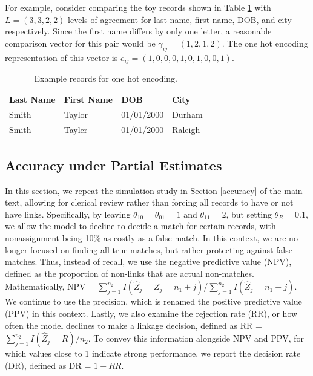 \documentclass[ba]{imsart}
\begin{document}
	For example, consider comparing the toy records shown in Table \ref{tab:ohe} with $L = (3, 3, 2, 2)$ levels of agreement for last name, first name, DOB, and city respectively. Since the first name differs by only one letter, a reasonable comparison vector for this pair would be $\gamma_{ij} = (1, 2, 1, 2)$. The one hot encoding representation of this vector is $e_{ij} = (1, 0, 0, 0, 1, 0, 1, 0, 0, 1)$. 
	\begin{table}[h!]
		\centering
		\begin{tabular}[h!]{llll}
			Last Name & First Name & DOB & City \\
			\hline
			Smith & Taylor & 01/01/2000 & Durham\\
			Smith & Tayler & 01/01/2000 & Raleigh\\
			\hline
		\end{tabular}
		\caption{Example records for one hot encoding.}\label{tab:ohe}
	\end{table}

	\hypertarget{partial}{%
	\subsection{Accuracy under Partial Estimates}\label{partial}}

In this section, we repeat the simulation study in Section \ref{accuracy} of the main text, allowing for clerical review rather than forcing all records to have or not have links.  Specifically, by leaving $\theta_{10} = \theta_{01} = 1$ and $\theta_{11} = 2$, but setting $\theta_R = 0.1$, we allow the model to decline to decide a match for certain records, with nonassignment being 10\% as costly as a false match. In this context, we are no longer focused on finding all true matches, but rather protecting against false matches. Thus, instead of recall, we use the negative predictive value (NPV), defined as the proportion of non-links that are actual non-matches. Mathematically, $\text{NPV} = \sum_{j=1}^{n_2} I(\hat{Z}_j = Z_j = n_1 + j)$/$\sum_{j=1}^{n_2} I(\hat{Z}_j = n_1 + j)$. We continue to use the precision, which is renamed the positive predictive value (PPV) in this context. Lastly, we also examine the rejection rate (RR), or how often the model declines to make a linkage decision, defined as RR = $\sum_{j=1}^{n_2} I(\hat{Z}_j = R)/n_2$. To convey this information alongside NPV and PPV, for which values close to 1 indicate strong performance, we report the decision rate (DR), defined as DR = $1 - RR$.
\end{document}

